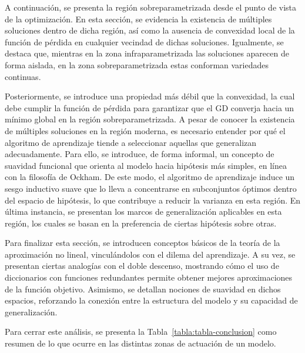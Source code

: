 A continuación, se presenta la región sobreparametrizada desde el punto de vista de la optimización. En esta sección, se evidencia la existencia de múltiples soluciones dentro de dicha región, así como la ausencia de convexidad local de la función de pérdida en cualquier vecindad de dichas soluciones. Igualmente, se destaca que, mientras en la zona infraparametrizada las soluciones aparecen de forma aislada, en la zona sobreparametrizada estas conforman variedades continuas. 

Posteriormente, se introduce una propiedad más débil que la convexidad, la cual debe cumplir la función de pérdida para garantizar que el GD converja hacia un mínimo global en la región sobreparametrizada. A pesar de conocer la existencia de múltiples soluciones en la región moderna, es necesario entender por qué el algoritmo de aprendizaje tiende a seleccionar aquellas que generalizan adecuadamente. Para ello, se introduce, de forma informal, un concepto de suavidad funcional que orienta al modelo hacia hipótesis más simples, en línea con la filosofía de Ockham. De este modo, el algoritmo de aprendizaje induce un sesgo inductivo suave que lo lleva a concentrarse en subconjuntos óptimos dentro del espacio de hipótesis, lo que contribuye a reducir la varianza en esta región. En última instancia, se presentan los marcos de generalización aplicables en esta región, los cuales se basan en la preferencia de ciertas hipótesis sobre otras.

Para finalizar esta sección, se introducen conceptos básicos de la teoría de la aproximación no lineal, vinculándolos con el dilema del aprendizaje. A su vez, se presentan ciertas analogías con el doble descenso, mostrando cómo el uso de diccionarios con funciones redundantes permite obtener mejores aproximaciones de la función objetivo. Asimismo, se detallan nociones de suavidad en dichos espacios, reforzando la conexión entre la estructura del modelo y su capacidad de generalización.

Para cerrar este análisis, se presenta la Tabla~\ref{tabla:tabla-conclusion} como resumen de lo que ocurre en las distintas zonas de actuación de un modelo.

